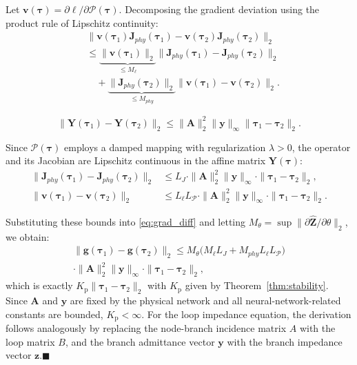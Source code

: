 \documentclass[journal]{IEEEtran}
\begin{document}
Let $\mathbf{v}(\boldsymbol{\tau})=\partial\ell/\partial\mathcal{P}(\boldsymbol{\tau})$. Decomposing the gradient deviation using the product rule of Lipschitz continuity:
\begin{equation}
\begin{aligned}
&\|\mathbf{v}(\boldsymbol{\tau}_1)\mathbf{J}_{phy}(\boldsymbol{\tau}_1)-\mathbf{v}(\boldsymbol{\tau}_2)\mathbf{J}_{phy}(\boldsymbol{\tau}_2)\|_2 \\
&\leq \underbrace{\|\mathbf{v}(\boldsymbol{\tau}_1)\|_2}_{\leq M_{\ell}}\|\mathbf{J}_{phy}(\boldsymbol{\tau}_1)-\mathbf{J}_{phy}(\boldsymbol{\tau}_2)\|_2 \\
&\quad +\underbrace{\|\mathbf{J}_{phy}(\boldsymbol{\tau}_2)\|_2}_{\leq M_{phy}}\|\mathbf{v}(\boldsymbol{\tau}_1)-\mathbf{v}(\boldsymbol{\tau}_2)\|_2.
\end{aligned}
\label{eq:grad_diff}
\end{equation}

\begin{equation}
\|\mathbf{Y}(\boldsymbol{\tau}_1)-\mathbf{Y}(\boldsymbol{\tau}_2)\|_2
\leq
\|\mathbf{A}\|_2^2
\|\mathbf{y}\|_{\infty}
\|\boldsymbol{\tau}_1-\boldsymbol{\tau}_2\|_2 .
\end{equation}

Since $\mathcal{P}(\boldsymbol{\tau})$ employs a damped mapping with regularization $\lambda>0$, the operator and its Jacobian are Lipschitz continuous in the affine matrix $\mathbf{Y}(\boldsymbol{\tau})$:
\begin{align}
\|\mathbf{J}_{phy}(\boldsymbol{\tau}_1)-\mathbf{J}_{phy}(\boldsymbol{\tau}_2)\|_2
&\leq L_{J}\cdot\|\mathbf{A}\|_2^2\|\mathbf{y}\|_{\infty}
\cdot\|\boldsymbol{\tau}_1-\boldsymbol{\tau}_2\|_2,\\
\|\mathbf{v}(\boldsymbol{\tau}_1)-\mathbf{v}(\boldsymbol{\tau}_2)\|_2
&\leq L_{\ell}L_{\mathcal{P}}\cdot\|\mathbf{A}\|_2^2\|\mathbf{y}\|_{\infty}
\cdot\|\boldsymbol{\tau}_1-\boldsymbol{\tau}_2\|_2.
\end{align}

Substituting these bounds into \eqref{eq:grad_diff} and letting $M_{\theta}=\sup\|\partial\hat{\mathbf{Z}}/\partial\theta\|_2$, we obtain:
\begin{multline}
\|\mathbf{g}(\boldsymbol{\tau}_1)-\mathbf{g}(\boldsymbol{\tau}_2)\|_2
\leq M_{\theta}\big(M_{\ell}L_{J}+M_{phy}L_{\ell}L_{\mathcal{P}}\big)\\
\cdot\|\mathbf{A}\|_2^2\|\mathbf{y}\|_{\infty}\cdot\|\boldsymbol{\tau}_1-\boldsymbol{\tau}_2\|_2,
\end{multline}
which is exactly $K_{\text{p}}\|\boldsymbol{\tau}_1-\boldsymbol{\tau}_2\|_2$ with $K_{\text{p}}$ given by Theorem~\ref{thm:stability}. Since $\mathbf{A}$ and $\mathbf{y}$ are fixed by the physical network and all neural-network-related constants are bounded, $K_{\text{p}}<\infty$. For the loop impedance equation, the derivation follows analogously by replacing the node-branch incidence matrix $A$ with the loop matrix $B$, and the branch admittance vector $\mathbf{y}$ with the branch impedance vector $\mathbf{z}$.\hfill $\blacksquare$
\end{document}
